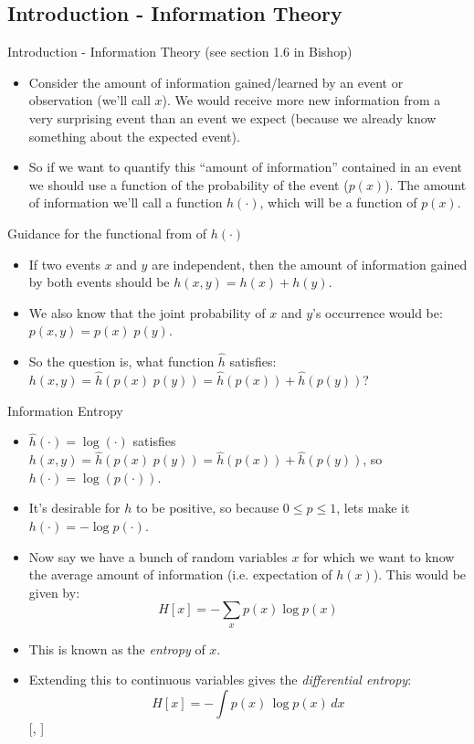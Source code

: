 \documentclass{beamer}
\begin{document}
\subsection{Introduction - Information Theory}

\begin{frame}{Introduction - Information Theory (see section 1.6 in Bishop)}
\begin{itemize}
\item Consider the amount of information gained/learned by an event or observation (we'll call $x$). We would receive more new information from a very surprising event than an event we expect (because we already know something about the expected event).
\item So if we want to quantify this ``amount of information'' contained in an event we should use a function of the probability of the event ($p(x)$). The amount of information we'll call a function $h(\cdot )$, which will be a function of $p(x)$.
\end{itemize}

\end{frame}


\begin{frame}{Guidance for the functional from of $h(\cdot ) $}
\begin{itemize}
\item If two events $x$ and $y$ are independent, then the amount of information gained by both events should be $h(x,y) = h(x) + h(y)$.
\item We also know that the joint probability of $x$ and $y$'s occurrence would be: $p(x,y) = p(x) \; p(y)$.
  \item So the question is, what function $\hat{h}$ satisfies: $h(x,y) = \hat{h}(p(x)\; p(y)) = \hat{h}(p(x)) + \hat{h}(p(y))$?
\end{itemize}

\end{frame}



\begin{frame}{Information Entropy}
\begin{itemize}
\item $\hat{h}(\cdot ) = \log ( \cdot )$ satisfies $h(x,y) = \hat{h}(p(x)\; p(y)) = \hat{h}(p(x)) + \hat{h}(p(y))$, so $h(\cdot ) = \log(p(\cdot ))$.
\item It's desirable for $h$ to be positive, so because $0 \leq p \leq 1$, lets make it $h(\cdot ) = -\log p(\cdot )$.
\item Now say we have a bunch of random variables $x$ for which we want to know the average amount of information (i.e. expectation of $h(x)$). This would be given by:
  \[H[x] = - \sum_x p(x) \log p(x) \]
\item This is known as the \textit{entropy} of $x$.
\item Extending this to continuous variables gives the \textit{differential entropy}:
  \[H[x] = - \int p(x)\, \log p(x)\, dx\][\cite{bishop}, \cite{shannon1948}]
\end{itemize}
\end{frame}
\end{document}
